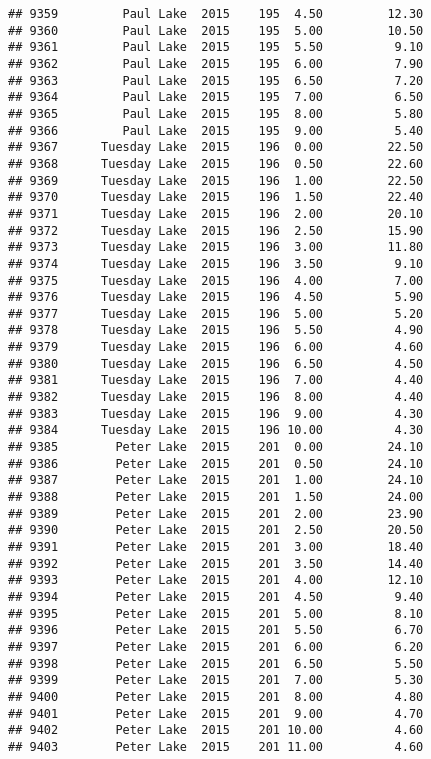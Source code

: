 \documentclass[
]{article}
\begin{document}
\begin{verbatim}
## 9359         Paul Lake  2015    195  4.50         12.30
## 9360         Paul Lake  2015    195  5.00         10.50
## 9361         Paul Lake  2015    195  5.50          9.10
## 9362         Paul Lake  2015    195  6.00          7.90
## 9363         Paul Lake  2015    195  6.50          7.20
## 9364         Paul Lake  2015    195  7.00          6.50
## 9365         Paul Lake  2015    195  8.00          5.80
## 9366         Paul Lake  2015    195  9.00          5.40
## 9367      Tuesday Lake  2015    196  0.00         22.50
## 9368      Tuesday Lake  2015    196  0.50         22.60
## 9369      Tuesday Lake  2015    196  1.00         22.50
## 9370      Tuesday Lake  2015    196  1.50         22.40
## 9371      Tuesday Lake  2015    196  2.00         20.10
## 9372      Tuesday Lake  2015    196  2.50         15.90
## 9373      Tuesday Lake  2015    196  3.00         11.80
## 9374      Tuesday Lake  2015    196  3.50          9.10
## 9375      Tuesday Lake  2015    196  4.00          7.00
## 9376      Tuesday Lake  2015    196  4.50          5.90
## 9377      Tuesday Lake  2015    196  5.00          5.20
## 9378      Tuesday Lake  2015    196  5.50          4.90
## 9379      Tuesday Lake  2015    196  6.00          4.60
## 9380      Tuesday Lake  2015    196  6.50          4.50
## 9381      Tuesday Lake  2015    196  7.00          4.40
## 9382      Tuesday Lake  2015    196  8.00          4.40
## 9383      Tuesday Lake  2015    196  9.00          4.30
## 9384      Tuesday Lake  2015    196 10.00          4.30
## 9385        Peter Lake  2015    201  0.00         24.10
## 9386        Peter Lake  2015    201  0.50         24.10
## 9387        Peter Lake  2015    201  1.00         24.10
## 9388        Peter Lake  2015    201  1.50         24.00
## 9389        Peter Lake  2015    201  2.00         23.90
## 9390        Peter Lake  2015    201  2.50         20.50
## 9391        Peter Lake  2015    201  3.00         18.40
## 9392        Peter Lake  2015    201  3.50         14.40
## 9393        Peter Lake  2015    201  4.00         12.10
## 9394        Peter Lake  2015    201  4.50          9.40
## 9395        Peter Lake  2015    201  5.00          8.10
## 9396        Peter Lake  2015    201  5.50          6.70
## 9397        Peter Lake  2015    201  6.00          6.20
## 9398        Peter Lake  2015    201  6.50          5.50
## 9399        Peter Lake  2015    201  7.00          5.30
## 9400        Peter Lake  2015    201  8.00          4.80
## 9401        Peter Lake  2015    201  9.00          4.70
## 9402        Peter Lake  2015    201 10.00          4.60
## 9403        Peter Lake  2015    201 11.00          4.60

\end{verbatim}
\end{document}
